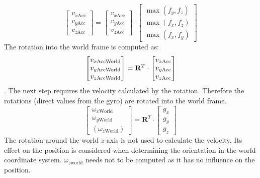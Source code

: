\documentclass[letterpaper, 10 pt, conference]{ieeeconf}  %
\newcommand{\M}[1]{\mathbf{#1}} %
\begin{document}
\begin{equation}
\begin{bmatrix}
v_{x\text{Acc}} \\ v_{y\text{Acc}} \\v_{z\text{Acc}} 
\end{bmatrix}
 = \begin{bmatrix}
v_{x\text{Acc}} \\ v_{y\text{Acc}} \\v_{z\text{Acc}} 
\end{bmatrix}  \cdot 
\begin{bmatrix}
\max(f_y, f_z) \\ \max(f_x, f_z) \\ \max(f_x, f_y) 
\end{bmatrix}
\end{equation}
The rotation into the world frame is computed as:
\begin{equation}
\begin{bmatrix}
v_{x\text{\text{AccWorld}}} \\ v_{y\text{AccWorld}} \\v_{z\text{AccWorld}} 
\end{bmatrix}
= \M R^T \cdot \begin{bmatrix}
v_{x\text{Acc}} \\ v_{y\text{Acc}} \\v_{z\text{Acc}} 
\end{bmatrix}
\end{equation}.
The next step requires the velocity calculated by the rotation.
Therefore the rotations (direct values from the gyro) are rotated into the world frame.
\begin{equation}
\begin{bmatrix}
\omega_{x\text{World}} \\ \omega_{y\text{World}} \\(\omega_{z\text{World}}) 
\end{bmatrix} = 
 \M R^T \cdot
\begin{bmatrix}
g_x \\ g_y\\ g_z
\end{bmatrix} 
\end{equation}
The rotation around the world $z$-axis is not used to calculate the velocity.
Its effect on the position is considered when determining the orientation in the world coordinate system.
$\omega_{z\text{world}}$ needs not to be computed as it has no influence on the position.
\end{document}
